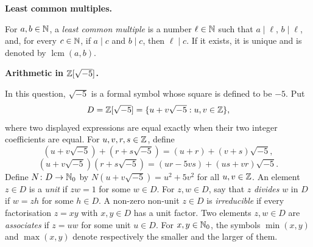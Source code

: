 \documentclass[10pt,a4paper]{article}
\newcommand{\concept}[1]{%
  \par\addvspace{0.55\baselineskip}\noindent\textbf{#1.}\enspace
}
\begin{document}
\concept{Least common multiples}
For $a,b\in\mathbb{N}$, a \emph{least common multiple} is a number $\ell\in\mathbb{N}$
such that $a\mid\ell$, $b\mid\ell$, and, for every $c\in\mathbb{N}$, if
$a\mid c$ and $b\mid c$, then $\ell\mid c$.  If it exists, it is unique
and is denoted by $\operatorname{lcm}(a,b)$.

\concept{Arithmetic in $\mathbb{Z}[\sqrt{-5}]$}
In this question, $\sqrt{-5}$ is a formal symbol whose square is defined to
be $-5$.  Put
\[
  D=\mathbb{Z}[\sqrt{-5}]=\{u+v\sqrt{-5}:u,v\in\mathbb{Z}\},
\]
where two displayed expressions are equal exactly when their two integer
coefficients are equal.  For $u,v,r,s\in\mathbb{Z}$, define
\[
  (u+v\sqrt{-5})+(r+s\sqrt{-5})=(u+r)+(v+s)\sqrt{-5},
\]
\[
  (u+v\sqrt{-5})(r+s\sqrt{-5})
    =(ur-5vs)+(us+vr)\sqrt{-5}.
\]
Define
$N\colon D\to\mathbb{N}_0$ by $N(u+v\sqrt{-5})=u^2+5v^2$ for all $u,v\in\mathbb{Z}$.
An element $z\in D$ is a \emph{unit} if $zw=1$ for some $w\in D$.
For $z,w\in D$, say that $z$ \emph{divides} $w$ in $D$ if $w=zh$ for
some $h\in D$.  A non-zero non-unit $z\in D$ is \emph{irreducible} if
every factorisation $z=xy$ with $x,y\in D$ has a unit factor.  Two elements
$z,w\in D$ are \emph{associates} if $z=uw$ for some unit $u\in D$.
For $x,y\in\mathbb{N}_0$, the symbols $\min(x,y)$ and $\max(x,y)$
denote respectively the smaller and the larger of them.
\end{document}
